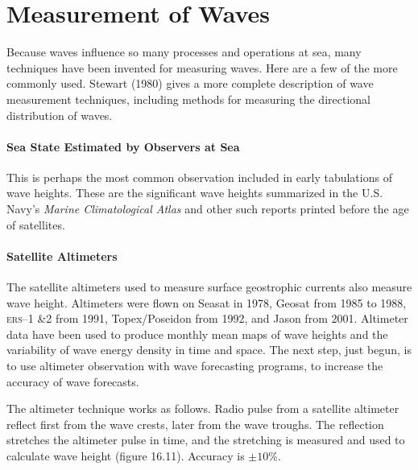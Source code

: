 \section{Measurement of Waves}
Because waves influence so many
processes and operations at sea, many techniques have been invented
for measuring waves. Here are a few of the more commonly used. Stewart
(1980) gives a more complete description of wave measurement
techniques, including methods for measuring the directional
distribution of waves.

\paragraph{Sea State Estimated by Observers at Sea}
This is perhaps the most common observation included in early
tabulations of wave heights. These are the significant wave heights
summarized in the U.S. Navy's \textit{Marine Climatological Atlas} and
other such reports printed before the age of satellites.

\paragraph{Satellite Altimeters}
The satellite altimeters used to measure surface
geo\-strophic currents also measure wave height. Altimeters were flown
on Seasat in 1978, Geosat from 1985 to 1988,
\textsc{ers--1 \&2} from 1991, Topex/Poseidon
from 1992, and Jason from 2001. Altimeter data have been
used to produce monthly mean maps of wave heights and the variability
of wave energy density in time and space. The next step, just begun,
is to use altimeter observation with wave forecasting programs, to
increase the accuracy of wave forecasts.

The altimeter technique works as follows. Radio pulse from a satellite
altimeter reflect first from the wave crests, later from the wave
troughs. The reflection stretches the altimeter pulse in time, and the
stretching is measured and used to calculate wave height (figure
16.11). Accuracy is $\pm 10$\%.

